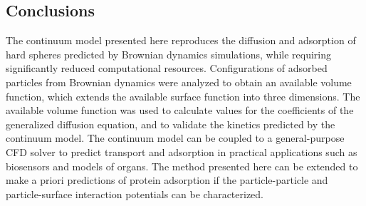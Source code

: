 \subsection{Conclusions}

The continuum model presented here reproduces the diffusion and adsorption
of hard spheres predicted by Brownian dynamics simulations, while
requiring significantly reduced computational resources. Configurations
of adsorbed particles from Brownian dynamics were analyzed to obtain
an available volume function, which extends the available surface
function into three dimensions. The available volume function was
used to calculate values for the coefficients of the generalized diffusion
equation, and to validate the kinetics predicted by the continuum
model. The continuum model can be coupled to a general-purpose CFD
solver to predict transport and adsorption in practical applications
such as biosensors and models of organs. The method presented here
can be extended to make a priori predictions of protein adsorption
if the particle-particle and particle-surface interaction potentials
can be characterized. 
